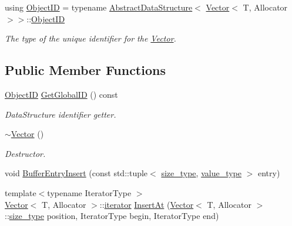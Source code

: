\begin{DoxyCompactItemize}
using \hyperlink{classshad_1_1Vector_a71193856f7dddb5e9fe0128fe5d12448}{Object\-I\-D} = typename \hyperlink{classshad_1_1AbstractDataStructure}{Abstract\-Data\-Structure}$<$ \hyperlink{classshad_1_1Vector}{Vector}$<$ T, Allocator $>$$>$\-::\hyperlink{classshad_1_1Vector_a71193856f7dddb5e9fe0128fe5d12448}{Object\-I\-D}
\begin{DoxyCompactList}\small\item\em The type of the unique identifier for the \hyperlink{classshad_1_1Vector}{Vector}. \end{DoxyCompactList}\end{DoxyCompactItemize}
\subsection*{Public Member Functions}
\begin{DoxyCompactItemize}
\item 
\hyperlink{classshad_1_1Vector_a71193856f7dddb5e9fe0128fe5d12448}{Object\-I\-D} \hyperlink{classshad_1_1Vector_a1624c9ed8f177f50071cdeff7ccb3c03}{Get\-Global\-I\-D} () const 
\begin{DoxyCompactList}\small\item\em Data\-Structure identifier getter. \end{DoxyCompactList}\item 
\hyperlink{classshad_1_1Vector_af3505368cf8e3cef009b8d1f894a8e97}{$\sim$\-Vector} ()
\begin{DoxyCompactList}\small\item\em Destructor. \end{DoxyCompactList}\item 
void \hyperlink{classshad_1_1Vector_ac34d718c025cee060735b3bced4cf38b}{Buffer\-Entry\-Insert} (const std\-::tuple$<$ \hyperlink{classshad_1_1Vector_a1c97f4eb87d738cb4de97e5b3587c397}{size\-\_\-type}, \hyperlink{classshad_1_1Vector_adb97b89826617473f44b4bb1dd3308ba}{value\-\_\-type} $>$ entry)
\item 
{\footnotesize template$<$typename Iterator\-Type $>$ }\\\hyperlink{classshad_1_1Vector}{Vector}$<$ T, Allocator $>$\-::\hyperlink{classshad_1_1Vector_aaa71fd41daa1548f8436bc54ef507976}{iterator} \hyperlink{classshad_1_1Vector_a6b3e4b374c0cdc673273716d08c83161}{Insert\-At} (\hyperlink{classshad_1_1Vector}{Vector}$<$ T, Allocator $>$\-::\hyperlink{classshad_1_1Vector_a1c97f4eb87d738cb4de97e5b3587c397}{size\-\_\-type} position, Iterator\-Type begin, Iterator\-Type end)
\item 

\end{DoxyCompactItemize}
